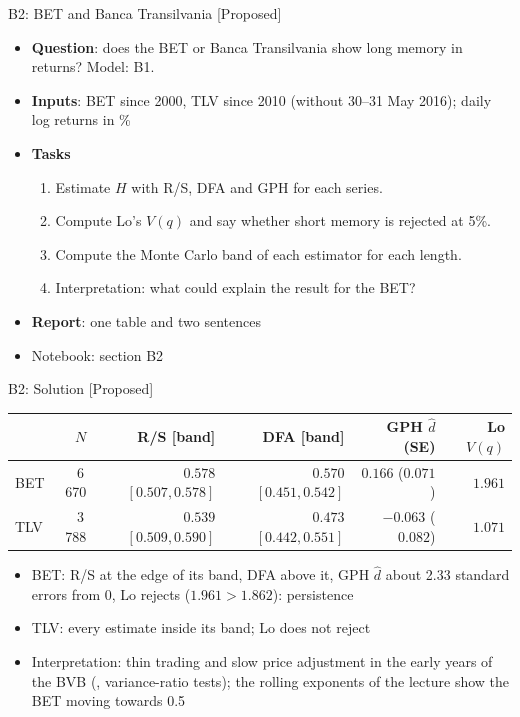 \begin{frame}{B2: BET and Banca Transilvania [Proposed]}
\itemsize{\footnotesize}
\begin{itemize}
\item \textbf{Question}: does the BET or Banca Transilvania show long memory in returns? Model: B1.
\item \textbf{Inputs}: BET since 2000, TLV since 2010 (without 30--31 May 2016); daily log returns in \%
\item \textbf{Tasks}
\begin{enumerate}
    \item Estimate $H$ with R/S, DFA and GPH for each series.
    \item Compute Lo's $V(q)$ and say whether short memory is rejected at 5\%.
    \item Compute the Monte Carlo band of each estimator for each length.
    \item Interpretation: what could explain the result for the BET?
\end{enumerate}
\item \textbf{Report}: one table and two sentences
\item Notebook: section B2
\end{itemize}
\end{frame}

\ifsolutions
\begin{frame}{B2: Solution [Proposed]}
\itemsize{\footnotesize}
\begin{center}
\scriptsize
\begin{tabular}{lrrrrr}
\toprule
 & $N$ & R/S [band] & DFA [band] & GPH $\hat d$ (SE) & Lo $V(q)$ \\
\midrule
BET & 6\,670 & $0.578$ $[0.507, 0.578]$ & $0.570$ $[0.451, 0.542]$ & $0.166$ ($0.071$) & $1.961$ \\
TLV & 3\,788 & $0.539$ $[0.509, 0.590]$ & $0.473$ $[0.442, 0.551]$ & $-0.063$ ($0.082$) & $1.071$ \\
\bottomrule
\end{tabular}
\end{center}
\begin{itemize}
    \item BET: R/S at the edge of its band, DFA above it, GPH $\hat d$ about 2.33 standard errors from 0, Lo rejects ($1.961 > 1.862$): persistence
    \item TLV: every estimate inside its band; Lo does not reject
    \item Interpretation: thin trading and slow price adjustment in the early years of the BVB (, variance-ratio tests); the rolling exponents of the lecture show the BET moving towards 0.5
\end{itemize}
\end{frame}
\fi

